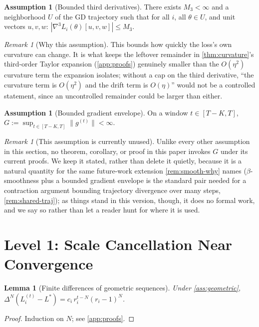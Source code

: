 \documentclass{article}
\theoremstyle{plain}
\newtheorem{lemma}[theorem]{Lemma}
\theoremstyle{definition}
\newtheorem{assumption}[theorem]{Assumption}
\theoremstyle{remark}
\newtheorem{remark}[theorem]{Remark}
\begin{document}
\begin{assumption}[Bounded third derivatives]
\label{ass:thirdderiv}
There exists $M_3<\infty$ and a neighborhood $U$ of the GD trajectory such that for all $i$, all $\theta\in U$, and unit vectors $u,v,w$: $|\nabla^3 L_i(\theta)[u,v,w]| \le M_3$.
\end{assumption}

\begin{remark}[Why this assumption]
\label{rem:thirdderiv-why}
This bounds how quickly the loss's own curvature can change. It is what keeps the leftover remainder in \cref{thm:curvature}'s third-order Taylor expansion (\cref{app:proofs}) genuinely smaller than the $O(\eta^2)$ curvature term the expansion isolates; without a cap on the third derivative, ``the curvature term is $O(\eta^2)$ and the drift term is $O(\eta)$'' would not be a controlled statement, since an uncontrolled remainder could be larger than either.
\end{remark}

\begin{assumption}[Bounded gradient envelope]
\label{ass:envelope}
On a window $t\in[T-K,T]$, $G := \sup_{t\in[T-K,T]}\|g^{(t)}\| < \infty$.
\end{assumption}

\begin{remark}[This assumption is currently unused]
\label{rem:envelope-why}
Unlike every other assumption in this section, no theorem, corollary, or proof in this paper invokes $G$ under its current proofs. We keep it stated, rather than delete it quietly, because it is a natural quantity for the same future-work extension \cref{rem:smooth-why} names ($\beta$-smoothness plus a bounded gradient envelope is the standard pair needed for a contraction argument bounding trajectory divergence over many steps, \cref{rem:shared-traj}); as things stand in this version, though, it does no formal work, and we say so rather than let a reader hunt for where it is used.
\end{remark}

\section{Level 1: Scale Cancellation Near Convergence}
\label{sec:level1}

\begin{lemma}[Finite differences of geometric sequences]
\label{lem:geomdiff}
Under \cref{ass:geometric}, $\Delta^N(L_i^{(t)}-L^*) = c_i\, r_i^{t-N}(r_i-1)^N$.
\end{lemma}
\begin{proof}
Induction on $N$; see \cref{app:proofs}.
\end{proof}
\end{document}
